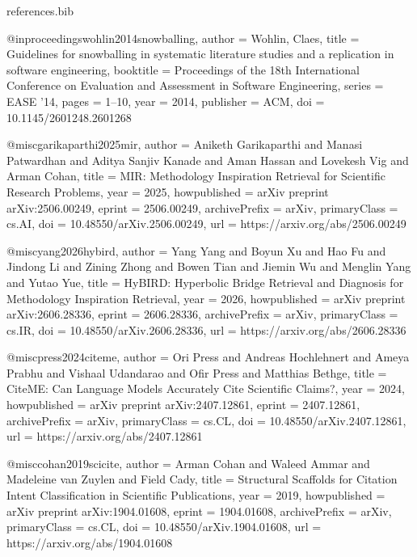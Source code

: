 \begin{filecontents*}{references.bib}

@inproceedings{wohlin2014snowballing,
  author    = {Wohlin, Claes},
  title     = {{Guidelines for snowballing in systematic literature studies and a replication in software engineering}},
  booktitle = {Proceedings of the 18th International Conference on Evaluation and Assessment in Software Engineering},
  series    = {EASE '14},
  pages     = {1--10},
  year      = {2014},
  publisher = {ACM},
  doi       = {10.1145/2601248.2601268}
}

@misc{garikaparthi2025mir,
  author        = {Aniketh Garikaparthi and Manasi Patwardhan and Aditya Sanjiv Kanade and Aman Hassan and Lovekesh Vig and Arman Cohan},
  title         = {{MIR: Methodology Inspiration Retrieval for Scientific Research Problems}},
  year          = {2025},
  howpublished  = {arXiv preprint arXiv:2506.00249},
  eprint        = {2506.00249},
  archivePrefix = {arXiv},
  primaryClass  = {cs.AI},
  doi           = {10.48550/arXiv.2506.00249},
  url           = {https://arxiv.org/abs/2506.00249}
}

@misc{yang2026hybird,
  author        = {Yang Yang and Boyun Xu and Hao Fu and Jindong Li and Zining Zhong and Bowen Tian and Jiemin Wu and Menglin Yang and Yutao Yue},
  title         = {{HyBIRD: Hyperbolic Bridge Retrieval and Diagnosis for Methodology Inspiration Retrieval}},
  year          = {2026},
  howpublished  = {arXiv preprint arXiv:2606.28336},
  eprint        = {2606.28336},
  archivePrefix = {arXiv},
  primaryClass  = {cs.IR},
  doi           = {10.48550/arXiv.2606.28336},
  url           = {https://arxiv.org/abs/2606.28336}
}

@misc{press2024citeme,
  author        = {Ori Press and Andreas Hochlehnert and Ameya Prabhu and Vishaal Udandarao and Ofir Press and Matthias Bethge},
  title         = {{CiteME: Can Language Models Accurately Cite Scientific Claims?}},
  year          = {2024},
  howpublished  = {arXiv preprint arXiv:2407.12861},
  eprint        = {2407.12861},
  archivePrefix = {arXiv},
  primaryClass  = {cs.CL},
  doi           = {10.48550/arXiv.2407.12861},
  url           = {https://arxiv.org/abs/2407.12861}
}

@misc{cohan2019scicite,
  author        = {Arman Cohan and Waleed Ammar and Madeleine van Zuylen and Field Cady},
  title         = {{Structural Scaffolds for Citation Intent Classification in Scientific Publications}},
  year          = {2019},
  howpublished  = {arXiv preprint arXiv:1904.01608},
  eprint        = {1904.01608},
  archivePrefix = {arXiv},
  primaryClass  = {cs.CL},
  doi           = {10.48550/arXiv.1904.01608},
  url           = {https://arxiv.org/abs/1904.01608}
}


\end{filecontents*}
